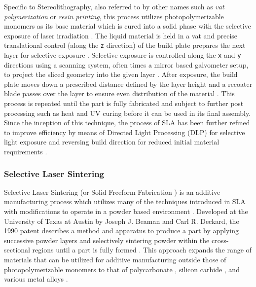 Specific to Stereolithography, also referred to by other names such as
\textit{vat polymerization} or \textit{resin printing}, this process utilizes
photopolymerizable monomers as its base material which is cured into a solid
phase with the selective exposure of laser irradiation
\cite{zakeri_comprehensive_2020, hull_apparatus_1986}. The liquid material is
held in a vat and precise translational control (along the \texttt{z} direction)
of the build plate prepares the next layer for selective exposure
\cite{zakeri_comprehensive_2020, hull_apparatus_1986}. Selective exposure is
controlled along the \texttt{x} and \texttt{y} directions using a scanning
system, often times a mirror based galvometer setup, to project the sliced
geometry into the given layer \cite{zakeri_comprehensive_2020,
hull_apparatus_1986}. After exposure, the build plate moves down a prescribed
distance defined by the layer height and a recoater blade passes over the layer
to ensure even distribution of the material \cite{zakeri_comprehensive_2020,
hull_apparatus_1986}. This process is repeated until the part is fully
fabricated and subject to further post processing such as heat and UV curing
before it can be used in its final assembly. Since the inception of this
technique, the process of SLA has been further refined to improve efficiency by
means of Directed Light Processing (DLP) \cite{chaudhary_additive_2023} for
selective light exposure and reversing build direction for reduced initial
material requirements \cite{zakeri_comprehensive_2020}.


\subsubsection{Selective Laser Sintering}
Selective Laser Sintering (or Solid Freeform Fabrication
\cite{kumar_selective_2003}) is an additive manufacturing process which utilizes
many of the techniques introduced in SLA with modifications to operate in a
powder based environment \cite{beaman_selective_1990, beaman_additive_2020,
hesselvig_efficient_2025, schmid_polymer_2015}. Developed at the University of
Texas at Austin by Joseph J. Beaman and Carl R. Deckard, the 1990 patent
describes a method and apparatus to produce a part by applying successive powder
layers and selectively sintering powder within the cross-sectional regions until
a part is fully formed \cite{beaman_selective_1990}. This approach expands the
range of materials that can be utilized for additive manufacturing outside those
of photopolymerizable monomers to that of polycarbonate \cite{ho_effects_1999,
berzins_densification_1995}, silicon carbide \cite{vail_silicon_1993}, and
various metal alloys \cite{niu_selective_2000, oneill_investigation_1999}.

